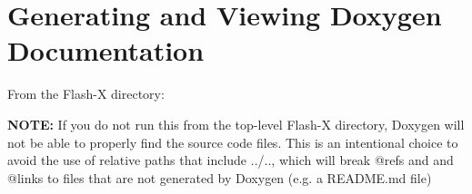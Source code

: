 \chapter{Generating and Viewing Doxygen Documentation}
\hypertarget{md_README}{}\label{md_README}
\label{md_README_autotoc_md0}%
%
 From the Flash-\/X directory\+:


\begin{DoxyCode}{0}
\DoxyCodeLine{}
\DoxyCodeLine{}

\end{DoxyCode}


{\bfseries{NOTE\+:}} If you do not run this from the top-\/level Flash-\/X directory, Doxygen will not be able to properly find the source code files. This is an intentional choice to avoid the use of relative paths that include {\ttfamily ../..}, which will break {\ttfamily @ref}s and and {\ttfamily @link}s to files that are not generated by Doxygen (e.\+g. a {\ttfamily README.\+md} file) 